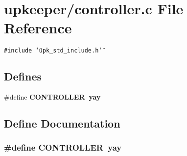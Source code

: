 \section{upkeeper/controller.c File Reference}
\label{controller_8c}
{\tt \#include \char`\"{}upk\_\-std\_\-include.h\char`\"{}}\par
\subsection*{Defines}
\begin{CompactItemize}
\item 
\#define \bf{CONTROLLER}~yay
\end{CompactItemize}


\subsection{Define Documentation}
\subsubsection{\setlength{\rightskip}{0pt plus 5cm}\#define CONTROLLER~yay}\label{controller_8c_09399a1e54fa3c0623cb2dbfbc268677}



